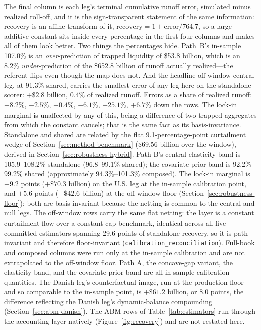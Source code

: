 \documentclass[12pt]{article}
\begin{document}
\begin{table}[H]
\begin{threeparttable}
\begin{tablenotes}[flushleft]
\item The final column is each leg's terminal cumulative runoff error, simulated minus realized roll-off, and it is the sign-transparent statement of the same information: recovery is an affine transform of it, $\text{recovery} = 1 + \text{error}/764.7$, so a large additive constant sits inside every percentage in the first four columns and makes all of them look better. Two things the percentages hide. Path~B's in-sample 107.0\% is an \emph{over}-prediction of trapped liquidity of \$53.8 billion, which is an 8.2\% \emph{under}-prediction of the \$652.8 billion of runoff actually realized---the referent flips even though the map does not. And the headline off-window central leg, at 91.3\% shared, carries the smallest error of any leg here on the standalone scorer: $+\$2.8$ billion, 0.4\% of realized runoff. Errors as a share of realized runoff: $+8.2\%$, $-2.5\%$, $+0.4\%$, $-6.1\%$, $+25.1\%$, $+6.7\%$ down the rows. The lock-in marginal is unaffected by any of this, being a difference of two trapped aggregates from which the constant cancels; that is the same fact as its basis-invariance. Standalone and shared are related by the flat 9.1-percentage-point curtailment wedge of Section~\ref{sec:method-benchmark} (\$69.56 billion over the window), derived in Section~\ref{sec:robustness-hybrid}. Path B's central elasticity band is 105.9--108.2\% standalone (96.8--99.1\% shared); the covariate-prior band is 92.2\%--99.2\% shared (approximately 94.3\%--101.3\% composed). The lock-in marginal is $+9.2$ points ($+\$70.3$ billion) on the U.S. leg at the in-sample calibration point, and $+5.6$ points ($+\$42.6$ billion) at the off-window floor (Section~\ref{sec:robustness-floor}); both are basis-invariant because the netting is common to the central and null legs. The off-window rows carry the same flat netting: the layer is a constant curtailment flow over a constant cap benchmark, identical across all five committed estimators spanning 29.6 points of standalone recovery, so it is path-invariant and therefore floor-invariant (\texttt{calibration\_reconciliation}). Full-book and composed columns were run only at the in-sample calibration and are not extrapolated to the off-window floor. Path A, the concave-gap variant, the elasticity band, and the covariate-prior band are all in-sample-calibration quantities. The Danish leg's counterfactual image, run at the production floor and so comparable to the in-sample point, is $+\$61.2$ billion, or 8.0 points, the difference reflecting the Danish leg's dynamic-balance compounding (Section~\ref{sec:abm-danish}). The ABM rows of Table~\ref{tab:estimators} run through the accounting layer natively (Figure~\ref{fig:recovery}) and are not restated here.
\end{tablenotes}
\end{threeparttable}
\end{table}
\end{document}
